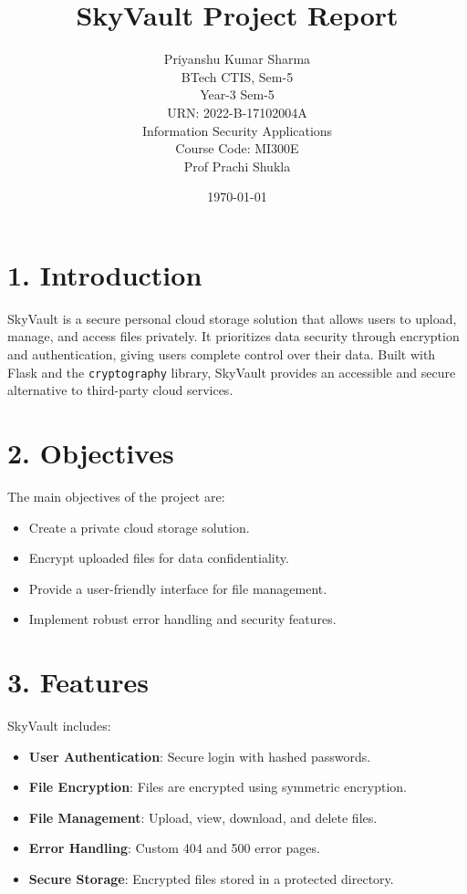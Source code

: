 \documentclass[12pt,a4paper]{article}
\title{\textbf{SkyVault Project Report}}
\author{Priyanshu Kumar Sharma\\ BTech CTIS, Sem-5\\ Year-3   Sem-5\\  URN: 2022-B-17102004A\\ Information Security Applications\\ Course Code: MI300E\\ Prof Prachi Shukla}
\date{\today}
\begin{document}

\maketitle

\section*{1. Introduction}
SkyVault is a secure personal cloud storage solution that allows users to upload, manage, and access files privately. It prioritizes data security through encryption and authentication, giving users complete control over their data. Built with Flask and the \texttt{cryptography} library, SkyVault provides an accessible and secure alternative to third-party cloud services.

\section*{2. Objectives}
The main objectives of the project are:
\begin{itemize}
    \item Create a private cloud storage solution.
    \item Encrypt uploaded files for data confidentiality.
    \item Provide a user-friendly interface for file management.
    \item Implement robust error handling and security features.
\end{itemize}

\section*{3. Features}
SkyVault includes:
\begin{itemize}
    \item \textbf{User Authentication}: Secure login with hashed passwords.
    \item \textbf{File Encryption}: Files are encrypted using symmetric encryption.
    \item \textbf{File Management}: Upload, view, download, and delete files.
    \item \textbf{Error Handling}: Custom 404 and 500 error pages.
    \item \textbf{Secure Storage}: Encrypted files stored in a protected directory.
\end{itemize}
\end{document}
